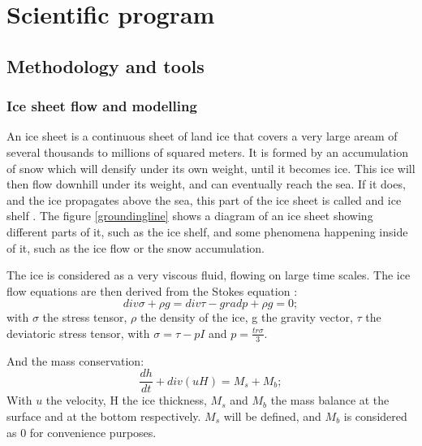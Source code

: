 \documentclass[a4paper,12pt]{article}
\begin{document}
\section{Scientific program}
\subsection{Methodology and tools}
\subsubsection{Ice sheet flow and modelling}
An ice sheet is a continuous sheet of land ice that covers a very large aream of several thousands to millions of squared meters. It is formed by an accumulation of snow which will densify under its own weight, until it becomes ice. This ice will then flow downhill under its weight, and can eventually reach the sea. If it does, and the ice propagates above the sea, this part of the ice sheet is called and ice shelf \cite[]{hutter1982mathematical}. The figure \ref{groundingline} shows a diagram of an ice sheet showing different parts of it, such as the ice shelf, and some phenomena happening inside of it, such as the ice flow or the snow accumulation.

The ice is considered as a very viscous fluid, flowing on large time scales. The ice flow equations are then derived from the Stokes equation \cite[]{hutter1982mathematical}:
\begin{equation}
	div\sigma + \rho g = div\tau - gradp + \rho g = 0;
\end{equation}
with $\sigma$ the stress tensor, $\rho$ the density of the ice, g the gravity vector, $\tau$ the deviatoric stress tensor, with $\sigma = \tau - pI$ and $p=\frac{tr\sigma}{3}$. 

And the mass conservation:
\begin{equation}
	\frac{dh}{dt}+ div(uH)=M_s + M_b;
\end{equation}
With $u$ the velocity, H the ice thickness, $M_s$ and $M_b$ the mass balance at the surface and at the bottom respectively. $M_s$ will be defined, and $M_b$ is considered as 0 for convenience purposes. 
\end{document}
